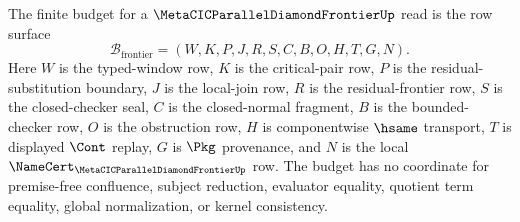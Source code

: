 \begin{definition}
\label{def:metacic-parallel-diamond-frontier-budget}
The finite budget for a $\MetaCICParallelDiamondFrontierUp$ read is the row surface
$$
\mathcal{B}_{\mathrm{frontier}}=(W,K,P,J,R,S,C,B,O,H,T,G,N).
$$
Here $W$ is the typed-window row, $K$ is the critical-pair row, $P$ is the residual-substitution boundary, $J$ is the local-join row, $R$ is the residual-frontier row, $S$ is the closed-checker seal, $C$ is the closed-normal fragment, $B$ is the bounded-checker row, $O$ is the obstruction row, $H$ is componentwise $\hsame$ transport, $T$ is displayed $\Cont$ replay, $G$ is $\Pkg$ provenance, and $N$ is the local $\NameCert_{\MetaCICParallelDiamondFrontierUp}$ row. The budget has no coordinate for premise-free confluence, subject reduction, evaluator equality, quotient term equality, global normalization, or kernel consistency.
\end{definition}

